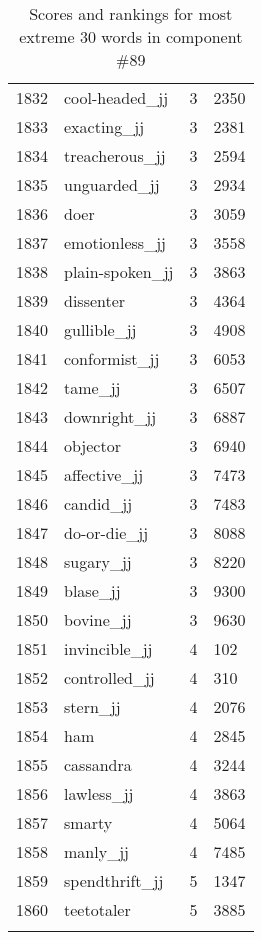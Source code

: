 \begin{longtable}[!htbp]{| rlr@{.}l |}
    1832 & cool-headed\_jj & 3 & 2350 \\
    1833 & exacting\_jj & 3 & 2381 \\
    1834 & treacherous\_jj & 3 & 2594 \\
    1835 & unguarded\_jj & 3 & 2934 \\
    1836 & doer & 3 & 3059 \\
    1837 & emotionless\_jj & 3 & 3558 \\
    1838 & plain-spoken\_jj & 3 & 3863 \\
    1839 & dissenter & 3 & 4364 \\
    1840 & gullible\_jj & 3 & 4908 \\
    1841 & conformist\_jj & 3 & 6053 \\
    1842 & tame\_jj & 3 & 6507 \\
    1843 & downright\_jj & 3 & 6887 \\
    1844 & objector & 3 & 6940 \\
    1845 & affective\_jj & 3 & 7473 \\
    1846 & candid\_jj & 3 & 7483 \\
    1847 & do-or-die\_jj & 3 & 8088 \\
    1848 & sugary\_jj & 3 & 8220 \\
    1849 & blase\_jj & 3 & 9300 \\
    1850 & bovine\_jj & 3 & 9630 \\
    1851 & invincible\_jj & 4 & 102 \\
    1852 & controlled\_jj & 4 & 310 \\
    1853 & stern\_jj & 4 & 2076 \\
    1854 & ham & 4 & 2845 \\
    1855 & cassandra & 4 & 3244 \\
    1856 & lawless\_jj & 4 & 3863 \\
    1857 & smarty & 4 & 5064 \\
    1858 & manly\_jj & 4 & 7485 \\
    1859 & spendthrift\_jj & 5 & 1347 \\
    1860 & teetotaler & 5 & 3885 \\
    \hline
    \caption{Scores and rankings for most extreme 30 words in component \#89} \\
\end{longtable}
